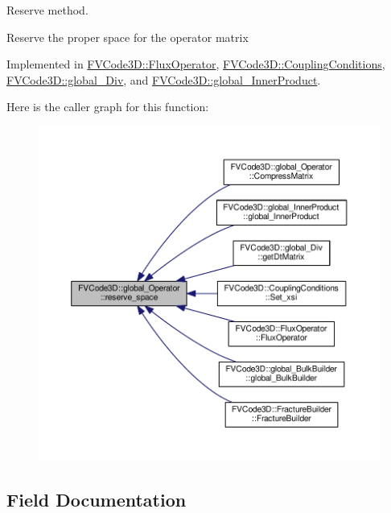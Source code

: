 Reserve method. 

Reserve the proper space for the operator matrix 

Implemented in \hyperlink{classFVCode3D_1_1FluxOperator_a9fe4f2f355610d1cbb921382253c3853}{F\+V\+Code3\+D\+::\+Flux\+Operator}, \hyperlink{classFVCode3D_1_1CouplingConditions_ae32eaf7920f8c314a010993d4a7c821d}{F\+V\+Code3\+D\+::\+Coupling\+Conditions}, \hyperlink{classFVCode3D_1_1global__Div_ac64b9c015a41c89a8358c48626a37744}{F\+V\+Code3\+D\+::global\+\_\+\+Div}, and \hyperlink{classFVCode3D_1_1global__InnerProduct_ad0aeb15cd9fffc009025e5bb5e4ed5b4}{F\+V\+Code3\+D\+::global\+\_\+\+Inner\+Product}.



Here is the caller graph for this function\+:
\nopagebreak
\begin{figure}[H]
\begin{center}
\leavevmode
\includegraphics[width=350pt]{classFVCode3D_1_1global__Operator_adeaf69c5dbde01c928a38778f8628d16_icgraph}
\end{center}
\end{figure}




\subsection{Field Documentation}
